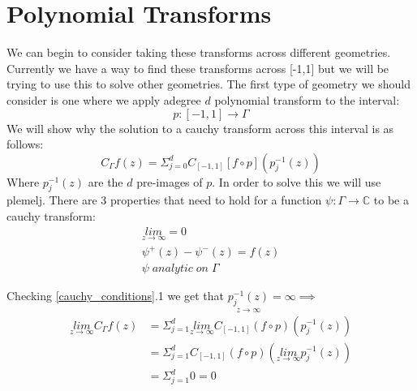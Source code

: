 \documentclass{article}
\begin{document}
\section{Polynomial Transforms}
We can begin to consider taking these transforms across different geometries.
Currently we have a way to find these transforms across [-1,1] but we will be trying to use this to solve other geometries.
The first type of geometry we should consider is one where we apply adegree $d$ polynomial transform to the interval:
$$p:[-1,1]\rightarrow \Gamma$$
We will show why the solution to a cauchy transform across this interval is as follows:
\begin{equation}
C_\Gamma f(z) = \Sigma_{j=0}^dC_{[-1,1]}[f\circ p](p_j^{-1}(z))
\end{equation}
Where $p_j^{-1}(z)$ are the $d$ pre-images of $p$.
In order to solve this we will use plemelj.
There are 3 properties that need to hold for a function $\psi: \Gamma \rightarrow \mathbb{C}$ to be a cauchy transform:
\begin{equation}\label{cauchy_conditions}\begin{gathered}
\underset{z\to\infty}{lim}= 0 \\
\psi^+(z)-\psi^-(z)= f(z) \\
\psi\;analytic\;on\;\Gamma 
\end{gathered}\end{equation}

Checking \eqref{cauchy_conditions}.1 we get that $\underset{z\to\infty}{p_j^{-1}(z)} = \infty \implies$
\begin{equation}\begin{split}
\underset{z\to\infty}{lim}C_\Gamma f(z) &= \Sigma_{j=1}^d \underset{z\to\infty}{lim}C_{[-1,1]}(f\circ p)(p_j^{-1}(z)) \\
&= \Sigma_{j=1}^d C_{[-1,1]}(f\circ p)(\underset{z\to\infty}{lim} p_j^{-1}(z)) \\
&= \Sigma_{j=1}^d 0 = 0
\end{split}\end{equation}
\end{document}
